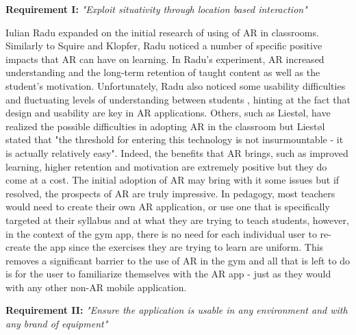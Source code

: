 \documentclass{l4proj}
\begin{document}
\textbf{Requirement I:} \textit{"Exploit situativity through location based interaction"} \label{requirement_I}


Iulian Radu expanded on the initial research of using of AR in classrooms. Similarly to Squire and Klopfer, Radu noticed a number of specific positive impacts that AR can have on learning. In Radu's experiment, AR increased understanding and the long-term retention of taught content as well as the student's motivation\cite{radu_why_2012}. Unfortunately, Radu also noticed some usability difficulties and fluctuating levels of understanding between students \cite{radu_why_2012}, hinting at the fact that design and usability are key in AR applications. Others, such as Liestøl, have realized the possible difficulties in adopting AR in the classroom but Liestøl stated that "the threshold for entering this technology is not insurmountable - it is actually relatively easy"\cite{liestol_learning_2011}. Indeed, the benefits that AR brings, such as improved learning, higher retention and motivation are extremely positive but they do come at a cost. The initial adoption of AR may bring with it some issues but if resolved, the prospects of AR are truly impressive. In  pedagogy, most teachers would need to create their own AR application, or use one that is specifically targeted at their syllabus and at what they are trying to teach students, however, in the context of the gym app, there is no need for each individual user to re-create the app since the exercises they are trying to learn are uniform. This removes a significant barrier to the use of AR in the gym and all that is left to do is for the user to familiarize themselves with the AR app - just as they would with any other non-AR mobile application. 

\textbf{Requirement II:} \textit{"Ensure the application is usable in any environment and with any brand of equipment"}  \label{requirement_II}
\end{document}
